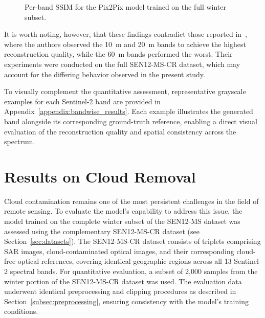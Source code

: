 \begin{figure}[!htbp]
\centering
{}
\caption[Per-band SSIM for the Pix2Pix model]{Per-band SSIM for the Pix2Pix model trained on the full winter subset.}
\label{fig:ssim_per_band}
\end{figure}

It is worth noting, however, that these findings contradict those reported in~\cite{CR_SEN2_dRNN}, where the authors observed the 10~m and 20~m bands to achieve the highest reconstruction quality, while the 60~m bands performed the worst. Their experiments were conducted on the full SEN12-MS-CR dataset, which may account for the differing behavior observed in the present study.

To visually complement the quantitative assessment, representative grayscale examples for each Sentinel-2 band are provided in Appendix~\ref{appendix:bandwise_results}. Each example illustrates the generated band alongside its corresponding ground-truth reference, enabling a direct visual evaluation of the reconstruction quality and spatial consistency across the spectrum.

\section{Results on Cloud Removal}
\label{sec:cloud_removal}
Cloud contamination remains one of the most persistent challenges in the field of remote sensing. To evaluate the model’s capability to address this issue, the model trained on the complete winter subset of the SEN12-MS dataset was assessed using the complementary SEN12-MS-CR dataset (see Section~\ref{sec:datasets}). The SEN12-MS-CR dataset consists of triplets comprising SAR images, cloud-contaminated optical images, and their corresponding cloud-free optical references, covering identical geographic regions across all 13 Sentinel-2 spectral bands.
For quantitative evaluation, a subset of 2,000 samples from the winter portion of the SEN12-MS-CR dataset was used. The evaluation data underwent identical preprocessing and clipping procedures as described in Section~\ref{subsec:preprocessing}, ensuring consistency with the model’s training conditions.

